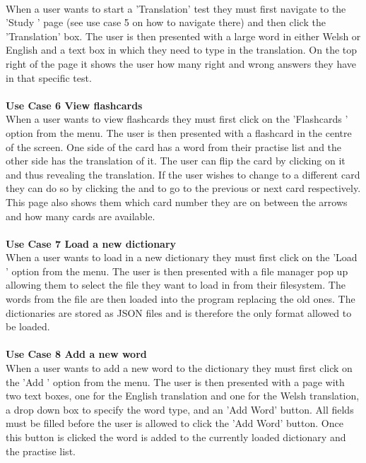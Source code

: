 \documentclass{project}
\newcommand*{\icon}[1]{%
  \raisebox{-.3\baselineskip}{%
    \texttt{[image: \#1]}%
  }%
}
\begin{document}
\\
When a user wants to start a 'Translation' test they must first navigate to the 'Study \icon{study-icon}' page (see use case 5 on how to navigate there) and then click the 'Translation' box. The user is then presented with a large word in either Welsh or English and a text box in which they need to type in the translation. On the top right of the page it shows the user how many right and wrong answers they have in that specific test.
\\\\
\textbf{Use Case 6 View flashcards}
\\
When a user wants to view flashcards they must first click on the 'Flashcards \icon{flashcard-icon}' option from the menu. The user is then presented with a flashcard in the centre of the screen. One side of the card has a word from their practise list and the other side has the translation of it. The user can flip the card by clicking on it and thus revealing the translation. If the user wishes to change to a different card they can do so by clicking the \icon{left-icon} and \icon{right-icon} to go to the previous or next card respectively. This page also shows them which card number they are on between the arrows and how many cards are available.
\\\\
\textbf{Use Case 7 Load a new dictionary}
\\
When a user wants to load in a new dictionary they must first click on the 'Load \icon{load-icon}' option from the menu. The user is then presented with a file manager pop up allowing them to select the file they want to load in from their filesystem. The words from the file are then loaded into the program replacing the old ones. The dictionaries are stored as JSON files and is therefore the only format allowed to be loaded.
\\\\
\textbf{Use Case 8 Add a new word}
\\
When a user wants to add a new word to the dictionary they must first click on the 'Add \icon{add-icon}' option from the menu. The user is then presented with a page with two text boxes, one for the English translation and one for the Welsh translation, a drop down box to specify the word type, and an 'Add Word' button. All fields must be filled before the user is allowed to click the 'Add Word' button. Once this button is clicked the word is added to the currently loaded dictionary and the practise list.
\\\\
\end{document}
